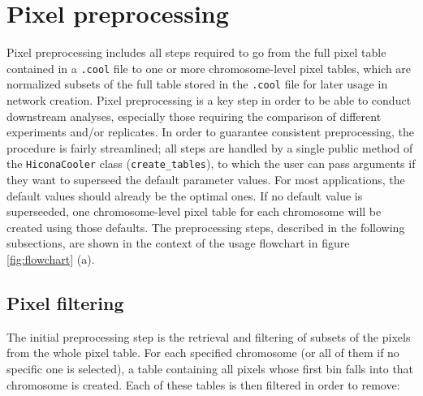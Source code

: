 \section{Pixel preprocessing}
Pixel preprocessing includes all steps required to go from the full pixel table contained in a \texttt{.cool} file to one or more chromosome-level pixel tables, which are normalized subsets of the full table stored in the \texttt{.cool} file for later usage in network creation.  
Pixel preprocessing is a key step in order to be able to conduct downstream analyses, especially those requiring the comparison of different experiments and/or replicates. In order to guarantee consistent preprocessing, the procedure is fairly streamlined; all steps are handled by a single public method of the \texttt{HiconaCooler} class (\texttt{create\_tables}), to which the user can pass arguments if they want to superseed the default parameter values. For most applications, the default values should already be the optimal ones. If no default value is superseeded, one chromosome-level pixel table for each chromosome will be created using those defaults. The preprocessing steps, described in the following subsections, are shown in the context of the usage flowchart in figure \ref{fig:flowchart} (a).

\subsection{Pixel filtering}\label{par:pixfiltering}

The initial preprocessing step is the retrieval and filtering of subsets of the pixels from the whole pixel table. For each specified chromosome (or all of them if no specific one is selected), a table containing all pixels whose first bin falls into that chromosome is created. Each of these tables is then filtered in order to remove:

